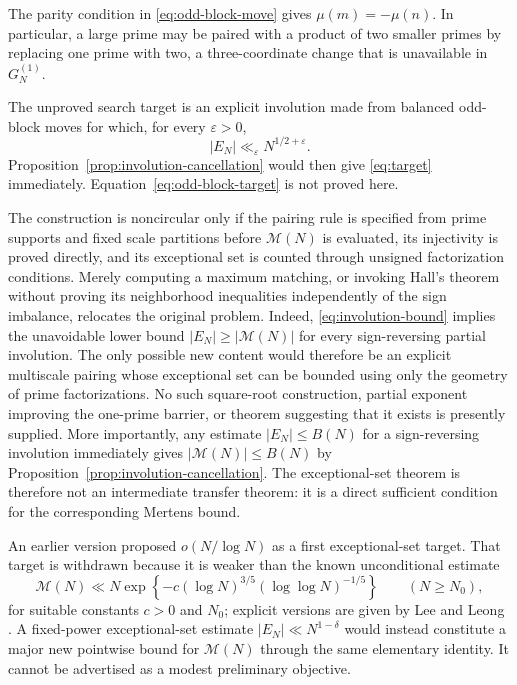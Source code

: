 \documentclass[11pt]{amsart}
\numberwithin{equation}{section}
\theoremstyle{plain}
\theoremstyle{definition}
\theoremstyle{remark}
\newcommand{\Mertens}{\mathcal M}
\newcommand{\eps}{\varepsilon}
\begin{document}
The parity condition in \eqref{eq:odd-block-move} gives
\(\mu(m)=-\mu(n)\).  In particular, a large prime may be paired with a product
of two smaller primes by replacing one prime with two, a three-coordinate
change that is unavailable in \(G_N^{(1)}\).

The unproved search target is an explicit involution made from balanced
odd-block moves for which, for every \(\eps>0\),
\begin{equation}
  |E_N|\ll_{\eps}N^{1/2+\eps}.
  \label{eq:odd-block-target}
\end{equation}
Proposition~\ref{prop:involution-cancellation} would then give
\eqref{eq:target} immediately.  Equation~\eqref{eq:odd-block-target} is not
proved here.

The construction is noncircular only if the pairing rule is specified from
prime supports and fixed scale partitions before \(\Mertens(N)\) is evaluated,
its injectivity is proved directly, and its exceptional set is counted through
unsigned factorization conditions.  Merely computing a maximum matching, or
invoking Hall's theorem \cite{Hall1935} without proving its neighborhood
inequalities independently of the sign imbalance, relocates the original
problem.  Indeed, \eqref{eq:involution-bound} implies the unavoidable lower
bound \(|E_N|\geq|\Mertens(N)|\) for every sign-reversing partial involution.
The only possible new content would therefore be an explicit multiscale
pairing whose exceptional set can be bounded using only the geometry of prime
factorizations.  No such square-root construction, partial exponent improving
the one-prime barrier, or theorem suggesting that it exists is presently
supplied.  More importantly, any estimate \(|E_N|\leq B(N)\) for a
sign-reversing involution immediately gives
\(|\Mertens(N)|\leq B(N)\) by
Proposition~\ref{prop:involution-cancellation}.  The exceptional-set theorem
is therefore not an intermediate transfer theorem: it is a direct sufficient
condition for the corresponding Mertens bound.

An earlier version proposed \(o(N/\log N)\) as a first exceptional-set target.
That target is withdrawn because it is weaker than the known unconditional
estimate
\begin{equation}
  \Mertens(N)\ll
  N\exp\!\left\{-c(\log N)^{3/5}(\log\log N)^{-1/5}\right\}
  \qquad(N\geq N_0),
  \label{eq:known-mertens-bound}
\end{equation}
for suitable constants \(c>0\) and \(N_0\); explicit versions are given by
Lee and Leong \cite{LeeLeong2024}.  A fixed-power exceptional-set estimate
\(|E_N|\ll N^{1-\delta}\) would instead constitute a major new pointwise
bound for \(\Mertens(N)\) through the same elementary identity.  It cannot be
advertised as a modest preliminary objective.
\end{document}
